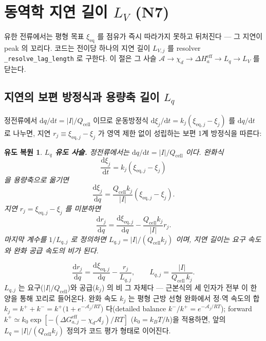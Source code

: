 \documentclass[11pt,a4paper]{article}
\newtheorem*{derivebox}{유도 복원}
\newcommand{\dd}{\mathrm{d}}
\newcommand{\eff}{\mathrm{eff}}
\newcommand{\eq}{\mathrm{eq}}
\newcommand{\cell}{\mathrm{cell}}
\newcommand{\code}[1]{\texttt{#1}}
\begin{document}
\section{동역학 지연 길이 $L_V$ (N7)}\label{sec:lag}
유한 전류에서는 평형 목표 $\xi_\eq$ 를 점유가 즉시 따라가지 못하고 뒤처진다 — 그 지연이 peak 의 꼬리다. 코드는 전이당
하나의 지연 길이 $L_{V,j}$ 를 resolver \code{\_resolve\_lag\_length} 로 구한다. 이 절은 그 사슬
$\mathcal A\to\chi_d\to\Delta H_a^\eff\to L_q\to L_V$ 를 닫는다.

\subsection{지연의 보편 방정식과 용량축 길이 $L_q$}
정전류에서 $\dd q/\dd t=|I|/Q_\cell$ 이므로 운동방정식 $\dd\xi_j/\dd t=k_j(\xi_{\eq,j}-\xi_j)$ 를 $\dd q/\dd t$ 로
나누면, 지연 $r_j\equiv\xi_{\eq,j}-\xi_j$ 가 영역 제한 없이 성립하는 보편 1계 방정식을 따른다:

\begin{derivebox}
\textbf{$L_q$ 유도 사슬.} 정전류에서는 $\dd q/\dd t=|I|/Q_{\cell}$ 이다. 완화식
\begin{equation*}
\frac{\dd\xi_j}{\dd t}=k_j(\xi_{\eq,j}-\xi_j)
\end{equation*}
을 용량축으로 옮기면
\begin{equation*}
\frac{\dd\xi_j}{\dd q}=\frac{Q_{\cell}k_j}{|I|}(\xi_{\eq,j}-\xi_j).
\end{equation*}
지연 $r_j=\xi_{\eq,j}-\xi_j$ 를 미분하면
\begin{equation*}
\frac{\dd r_j}{\dd q}=\frac{\dd\xi_{\eq,j}}{\dd q}-\frac{Q_{\cell}k_j}{|I|}r_j.
\end{equation*}
마지막 계수를 $1/L_{q,j}$ 로 정의하면 $L_{q,j}=|I|/(Q_{\cell}k_j)$ 이며, 지연 길이는 요구 속도와 완화 공급 속도의 비가 된다.
\end{derivebox}

\begin{equation}
\frac{\dd r_j}{\dd q}=\frac{\dd\xi_{\eq,j}}{\dd q}-\frac{r_j}{L_{q,j}},
\qquad L_{q,j}=\frac{|I|}{Q_\cell\,k_j}.
\label{eq:Lq}
\end{equation}
$L_{q,j}$ 는 요구($|I|/Q_\cell$)와 공급($k_j$) 의 비 그 자체다 — 근본식의 세 인자가 전부 이 한 양을 통해 꼬리로
들어온다. 완화 속도 $k_j$ 는 평형 근방 선형 완화에서 정$\cdot$역 속도의 합 $k_j=k^++k^-=k^+\big(1+e^{-\mathcal A_j/RT}\big)$ 다(detailed balance $k^-/k^+=e^{-\mathcal A_j/RT}$); forward $k^+\simeq k_0\exp[-(\Delta G_{a,j}^\eff-\chi_d\mathcal A_j)/RT]$
($k_0=k_BT/h$)을 적용하면, 앞의 $L_q=|I|/(Q_\cell k_j)$ 정의가 코드 평가 형태로 이어진다.
\end{document}
